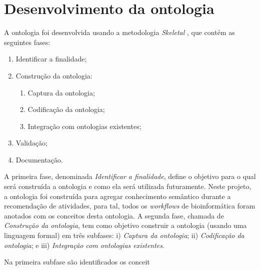 \section{Desenvolvimento da ontologia}\label{SEC_DESENVOLVIMENTO_DA_ONTOLOGIA} 
A ontologia foi desenvolvida usando a metodologia \emph{Skeletal} \cite{Uschold95}, que contém as seguintes fases:
\begin{enumerate}
	\item Identificar a finalidade;
	\item Construção da ontologia:
	\begin{enumerate}
		\item Captura da ontologia;
		\item Codificação da ontologia;
		\item Integração com ontologias existentes;
	\end{enumerate}
	\item Validação;
	\item Documentação.
\end{enumerate}

A primeira fase, denominada \emph{Identificar a finalidade}, define o objetivo para o qual será construída a ontologia e como ela será utilizada futuramente. Neste projeto, a ontologia foi construída para agregar conhecimento semântico durante a recomendação de atividades, para tal, todos os \emph{workflows} de bioinformática foram anotados com os conceitos desta ontologia. A segunda fase, chamada de \emph{Construção da ontologia}, tem como objetivo construir a ontologia (usando uma linguagem formal) em três subfases: i) \emph{Captura da ontologia}; ii) \emph{Codificação da ontologia}; e iii) \emph{Integração com ontologias existentes}. 

Na primeira subfase são identificados os conceit\usepackage[utf8]{inputenc}		%
\usepackage{lastpage}			%
\usepackage{indentfirst}		%
\usepackage{color}				%
\usepackage{graphicx}			%

\usepackage{microtype} 			%

